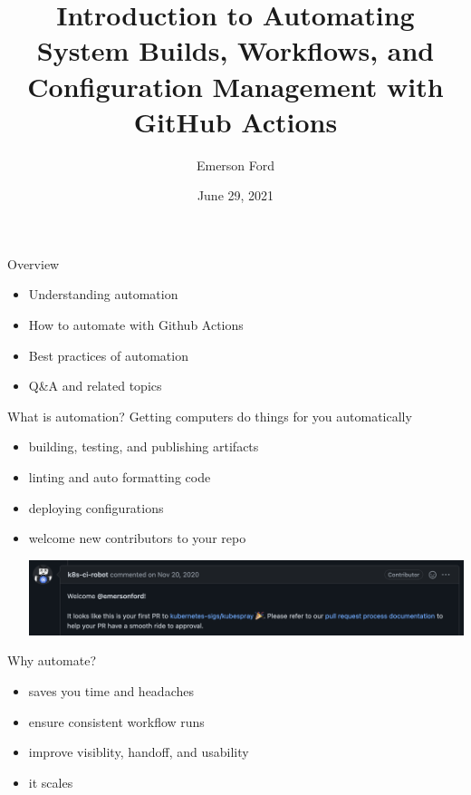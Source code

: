 \documentclass{beamer}
\title{Introduction to Automating System Builds, Workflows, and Configuration Management with GitHub Actions}
\date{June 29, 2021}
\author{Emerson Ford}
\institute{University of Utah -- ITX Meeting}
\begin{document}
\maketitle

\begin{frame}{Overview}
    \begin{itemize}
        \item Understanding automation
        \item How to automate with Github Actions
        \item Best practices of automation
        \item Q\&A and related topics
    \end{itemize}
\end{frame}

\begin{frame}{What is automation?}
    Getting computers do things for you automatically
    \begin{itemize}
        \item building, testing, and publishing artifacts
        \item linting and auto formatting code
        \item deploying configurations
        \item welcome new contributors to your repo \begin{minipage}{\linewidth}\vspace{2pt}\includegraphics[width=0.8\linewidth]{welcome.png}\end{minipage}
    \end{itemize}
\end{frame}

\begin{frame}{Why automate?}
    \begin{itemize}
        \item saves you time and headaches
        \item ensure consistent workflow runs
        \item improve visiblity, handoff, and usability
        \item it scales
    \end{itemize}
\end{frame}
\end{document}

